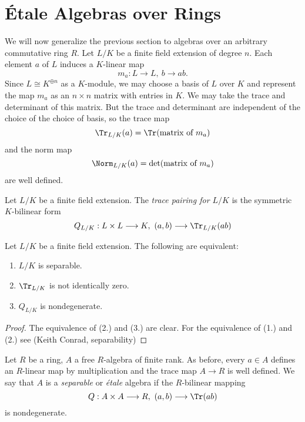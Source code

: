 \section{\'Etale Algebras over Rings}
We will now generalize the previous section to algebras over an arbitrary commutative ring $R$. Let $L/K$ be a finite field extension of degree $n$. Each element $a$ of $L$ induces a $K$-linear map
\[
	m_a: L \to L,\ b \to ab.
\]
Since $L \cong K^{\oplus n}$ as a $K$-module, we may choose a basis of $L$ over $K$ and represent the map $m_a$ as an $n \times n$ matrix with entries in $K$. We may take the trace and determinant of this matrix. But the trace and determinant are independent of the choice of the choice of basis, so the trace map
\[
	\Tr_{L/K}(a) = \Tr(\text{matrix of }m_a)
\]
and the norm map
\[
	\Norm_{L/K}(a) = \text{det}(\text{matrix of }m_a)
\]
are well defined.

\begin{definition}
	Let $L/K$ be a finite field extension. The \textit{trace pairing for $L/K$} is the symmetric $K$-bilinear form
	\[
		Q_{L/K} : L \times L \to K,\ (a,b) \to \Tr_{L/K}(ab)
	\]
\end{definition}

\begin{lemma}
	Let $L/K$ be a finite field extension. The following are equivalent:
	\begin{enumerate}
		\item $L/K$ is separable.
		\item $\Tr_{L/K}$ is not identically zero.
		\item $Q_{L/K}$ is nondegenerate.
	\end{enumerate}
\end{lemma}

\begin{proof}
	The equivalence of (2.) and (3.) are clear.
	For the equivalence of (1.) and (2.) see (Keith Conrad, separability)
\end{proof}

\begin{definition}
	Let $R$ be a ring, $A$ a free $R$-algebra of finite rank. As before, every $a \in A$ defines an $R$-linear map by multiplication and the trace map $A \to R$ is well defined. We say that $A$ is a \textit{separable} or \textit{\'etale} algebra if the $R$-bilinear mapping
	\[
		Q : A \times A \to R,\ (a,b) \to \Tr(ab)
	\]
	is nondegenerate.
\end{definition}
